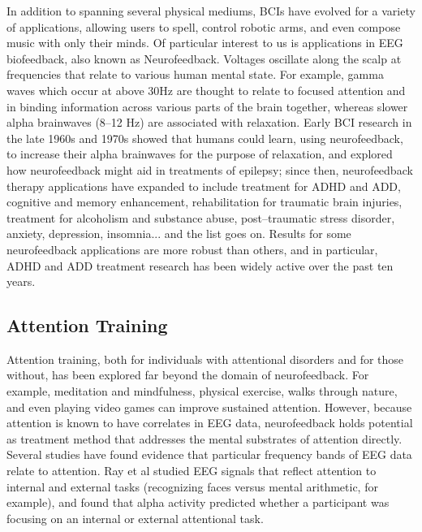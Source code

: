 \documentclass[12pt]{report}
\begin{document}
	In addition to spanning several physical mediums, BCIs have evolved for a variety of applications, allowing users to spell\cite{Kaper}, control robotic arms\cite{Chae}, and even compose music\cite{Yao} with only their minds.  Of particular interest to us is applications in EEG biofeedback, also known as Neurofeedback.  Voltages oscillate along the scalp at frequencies that relate to various human mental state.  For example, gamma waves which occur at above 30Hz are thought to relate to focused attention and in binding information across various parts of the brain together, whereas slower alpha brainwaves (8--12 Hz) are associated with relaxation\cite{Hammond}.  Early BCI research in the late 1960s and 1970s showed that humans could learn, using neurofeedback, to increase their alpha  brainwaves for the purpose of relaxation, and explored how neurofeedback might aid in treatments of epilepsy; since then, neurofeedback therapy applications have expanded to include treatment for ADHD and ADD, cognitive and memory enhancement, rehabilitation for traumatic brain injuries, treatment for alcoholism and substance abuse, post--traumatic stress disorder, anxiety, depression, insomnia... and the list goes on\cite{Hammond}.  Results for some neurofeedback applications are more robust than others, and in particular, ADHD and ADD treatment research has been widely active over the past ten years.  

\subsection{Attention Training}

	Attention training, both for individuals with attentional disorders and for those without, has been explored far beyond the domain of neurofeedback.  For example, meditation and mindfulness, physical exercise, walks through nature, and even playing video games can improve sustained attention\cite{TurkBrowne}.  However, because attention is known to have correlates in EEG data, neurofeedback holds potential as treatment method that addresses the mental substrates of attention directly.
	Several studies have found evidence that particular frequency bands of EEG data relate to attention.  Ray et al\cite{Ray} studied EEG signals that reflect attention to internal and external tasks (recognizing faces versus mental arithmetic, for example), and found that alpha activity predicted whether a participant was focusing on an internal or external attentional task.  
\end{document}
